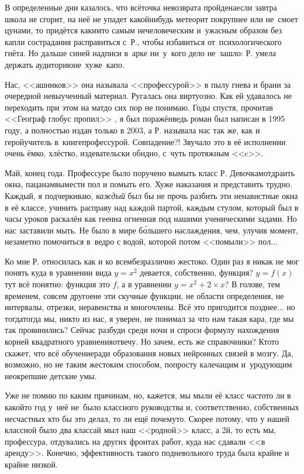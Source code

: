 В определенные дни казалось, что всё\mdash точка невозврата пройдена\mdash если завтра школа не сгорит, на неё не упадет какой\sdash нибудь метеорит покрупнее или не~смоет цунами, то придётся каким\sdash то самым нечеловеческим и~ужасным образом без капли сострадания расправиться с~Р., чтобы избавиться от~психологического гнёта. Но дальше синей надписи в~арке ни~у~кого дело не~зашло: Р. умела держать аудиторию\mdash не~хуже~капо.

Нас, <<ашников>> она называла <<профессурой>> в пылу гнева и брани за очередной невыученный материал. Ругалась она виртуозно. Как ей удавалось не переходить при этом на мат\mdash до сих пор не понимаю. Годы спустя, прочитав <<Географ глобус пропил>> \cite{ГеографГлобусПропил}, я был поражён\mdash ведь роман был написан в 1995 году, а полностью издан только в 2003, а Р. называла нас так же, как и герой\sdash учитель в~книге\mdash профессурой. Совпадение?! Звучало это в её исполнении очень ёмко, хлёстко, издевательски обидно, с~чуть протяжным <<c>>.

Май, конец года. Профессуре было поручено вымыть класс Р. Девочкам\mdash отдраить окна, пацанам\mdash вымести пол и помыть его. Хуже наказания и представить трудно. Каждый, я подчеркиваю, \textit{каждый} был бы не прочь разбить эти ненавистные окна в её классе, учинить расправу над каждой партой, каждым стулом, который был в часы уроков раскалён как геенна огненная под нашими ученическими задами. Но нас заставили мыть. Не было в мире б\'{о}льшего наслаждения, чем, улучив момент, незаметно помочиться в~ведро с водой, которой потом <<помыли>> пол$\ldots$

Ко мне Р. относилась как и ко всем\mdash безразлично жестоко. Один раз я никак не мог понять куда в уравнении вида ${y=x^2}$ девается, собственно, функция? ${y=f(x)}$\mdash тут всё понятно: функция это $f$, а в уравнении ${y=x^2 + 2\times x}$? В голове, тем временем, совсем другое\mdash не эти скучные функции, не области определения, не интервалы, отрезки, неравенства и многочлены. Всё это пригодится позднее$\ldots$ но тогда\mdash тогда мы, никто из нас, я уверен, не понимал за что нам такая кара, где мы так провинились? Сейчас разбуди среди ночи и спроси формулу нахождения корней квадратного уравнения\mdash отвечу. Но зачем, есть же справочники? Кто\sdash то скажет, что всё обучение\mdash ради образования новых нейронных связей в мозгу. Да, возможно, но не таким жестоким способом, попросту калечащим и~уродующим неокрепшие детские умы. 

Уже не помню по каким причинам, но, кажется, мы мыли её класс часто\mdash то ли в какой\sdash то год у~неё не~было классного руководства и, соответственно, собственных несчастных кто бы это делал, то ли ещё почему\sdash то. Скорее потому, что у нашей классной было два класса\sdash й мыл наш <<родной>> класс, а 2\sdash й, то есть мы, профессура, отдувались на других фронтах работ, куда нас сдавали <<в аренду>>. Конечно, эффективность такого подневольного труда была крайне и крайне низкой. 

